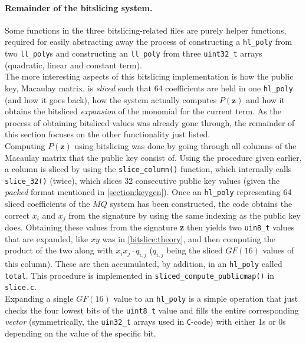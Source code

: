 \paragraph{Remainder of the bitslicing system.}
Some functions in the three bitslicing-related files are purely helper functions, required for easily abstracting away the process of constructing a \texttt{hl\_poly} from two \texttt{ll\_poly}s and constructing an \texttt{ll\_poly} from three \texttt{uint32\_t} arrays (quadratic, linear and constant term).
\medskip\\
The more interesting aspects of this bitslicing implementation is how the public key, Macaulay matrix, is \emph{sliced} such that 64 coefficients are held in one \texttt{hl\_poly} (and how it goes back), how the system actually computes $P(\textbf{z})$ and how it obtains the bitsliced \emph{expansion} of the monomial for the current term. As the process of obtaining bitsliced values was already gone through, the remainder of this section focuses on the other functionality just listed.
\medskip\\
Computing $P(\textbf{z})$ using bitslicing was done by going through all columns of the Macaulay matrix that the public key consist of. Using the procedure given earlier, a column is sliced by using the \texttt{slice\_column()} function, which internally calls \texttt{slice\_32()} (twice), which slices 32 consecutive public key values (given the \emph{packed} format mentioned in \cref{section:keygen}). Once an \texttt{hl\_poly} representing 64 sliced coefficients of the $MQ$ system has been constructed, the code obtains the correct $x_i$ and $x_j$ from the signature by using the same indexing as the public key does. Obtaining these values from the signature \textbf{z} then yields two \texttt{uin8\_t} values that are expanded, like $xy$ was in \cref{bitslice:theory}, and then computing the product of the two along with $x_ix_j \cdot q_{i,j}$ ($q_{i,j}$ being the sliced $GF(16)$ values of this column). These are then accumulated, by addition, in an \texttt{hl\_poly} called \texttt{total}. This procedure is implemented in \texttt{sliced\_compute\_publicmap()} in \texttt{slice.c}.
\medskip\\
Expanding a single $GF(16)$ value to an \texttt{hl\_poly} is a simple operation that just checks the four lowest bits of the \texttt{uint8\_t} value and fills the entire corresponding \emph{vector} (symmetrically, the \texttt{uin32\_t} arrays used in \texttt{C}-code) with either 1s or 0s depending on the value of the specific bit.
\medskip\\
